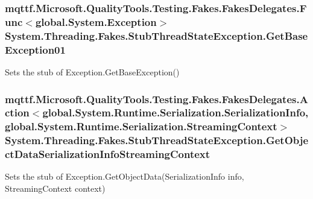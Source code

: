 \hypertarget{class_system_1_1_threading_1_1_fakes_1_1_stub_thread_state_exception_ab56834ef8fb8b4206373b020fed7f01a}{
\subsubsection[{Get\-Base\-Exception01}]{\setlength{\rightskip}{0pt plus 5cm}mqttf.\-Microsoft.\-Quality\-Tools.\-Testing.\-Fakes.\-Fakes\-Delegates.\-Func$<$global.\-System.\-Exception$>$ System.\-Threading.\-Fakes.\-Stub\-Thread\-State\-Exception.\-Get\-Base\-Exception01}}\label{class_system_1_1_threading_1_1_fakes_1_1_stub_thread_state_exception_ab56834ef8fb8b4206373b020fed7f01a}


Sets the stub of Exception.\-Get\-Base\-Exception()

\hypertarget{class_system_1_1_threading_1_1_fakes_1_1_stub_thread_state_exception_a11f4bcf692ad36ae572be4714a192ea4}{
\subsubsection[{Get\-Object\-Data\-Serialization\-Info\-Streaming\-Context}]{\setlength{\rightskip}{0pt plus 5cm}mqttf.\-Microsoft.\-Quality\-Tools.\-Testing.\-Fakes.\-Fakes\-Delegates.\-Action$<$global.\-System.\-Runtime.\-Serialization.\-Serialization\-Info, global.\-System.\-Runtime.\-Serialization.\-Streaming\-Context$>$ System.\-Threading.\-Fakes.\-Stub\-Thread\-State\-Exception.\-Get\-Object\-Data\-Serialization\-Info\-Streaming\-Context}}\label{class_system_1_1_threading_1_1_fakes_1_1_stub_thread_state_exception_a11f4bcf692ad36ae572be4714a192ea4}


Sets the stub of Exception.\-Get\-Object\-Data(\-Serialization\-Info info, Streaming\-Context context)

